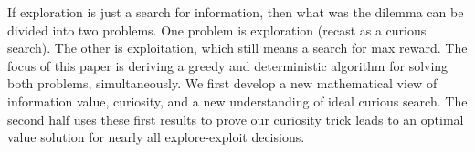 If exploration is just a search for information, then what was the dilemma can be divided into two problems. One problem is exploration (recast as a curious search). The other is exploitation, which still means a search for max reward. The focus of this paper is deriving a greedy and deterministic algorithm for solving both problems, simultaneously. We first develop a new mathematical view of information value, curiosity, and a new understanding of ideal curious search. The second half uses these first results to prove our curiosity trick leads to an optimal value solution for nearly all explore-exploit decisions.